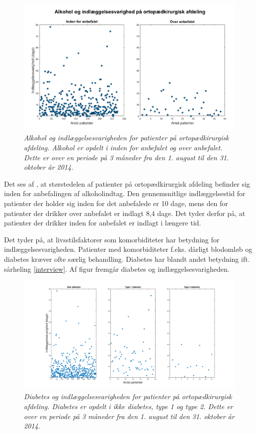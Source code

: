\begin{figure}[H]
	\centering
	\includegraphics[scale=0.55]{figures/alkohologindlaeg}
	\caption{\textit{Alkohol og indlæggelsesvarigheden for patienter på ortopædkirurgisk afdeling. Alkohol er opdelt i inden for anbefalet og over anbefalet. Dette er over en periode på 3 måneder fra den 1. august til den 31. oktober år 2014. }}
	\label{alkohologindlaeggelse}
\end{figure}


\noindent
Det ses af , at størstedelen af patienter på ortopædkirurgisk afdeling befinder sig inden for anbefalingen af alkoholindtag. Den gennemsnitlige indlæggelsestid for patienter der holder sig inden for det anbefalede er 10 dage, mens den for patienter der drikker over anbefalet er indlagt 8,4 dage. Det tyder derfor på, at patienter der drikker inden for anbefalet er indlagt i længere tid. 

Det tyder på, at livsstilsfaktorer som komorbiditeter har betydning for indlæggelsesvarigheden. Patienter med komorbiditeter f.eks. dårligt blodomløb og diabetes kræver ofte særlig behandling. Diabetes har blandt andet betydning ift. sårheling \ref{interview}. Af figur  fremgår diabetes og indlæggelsesvarigheden. 

\begin{figure}[H]
	\centering
	\includegraphics[scale=0.35]{figures/diabetesogindlaeg}
	\caption{\textit{Diabetes og indlæggelsesvarigheden for patienter på ortopædkirurgisk afdeling. Diabetes er opdelt i ikke diabetes, type 1 og type 2. Dette er over en periode på 3 måneder fra den 1. august til den 31. oktober år 2014. }}
	\label{diabetesogindlaeggelse}
\end{figure}

